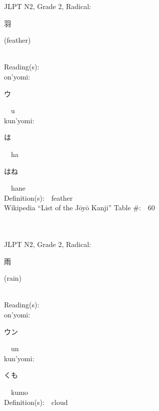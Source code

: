 \begin{multicols}{2}
{JLPT N2, Grade 2, Radical:\ \ {\begin{CJK}{UTF8}{min} 羽 \end{CJK}} (feather) } \\
Reading(s):\ \ \\
{\hspace*{1em}}on'yomi:\ \ \\
{\hspace*{2em}}{\begin{CJK}{UTF8}{min} ウ \end{CJK}}\ \ u\ \ \\
{\hspace*{1em}}kun'yomi:\ \ \\
{\hspace*{2em}}{\begin{CJK}{UTF8}{min} は \end{CJK}}\ \ ha\ \ \\
{\hspace*{2em}}{\begin{CJK}{UTF8}{min} はね \end{CJK}}\ \ hane\ \ \\
Definition(s):\ \ feather \\
Wikipedia ``List of the J\=oy\=o Kanji'' Table \#:\ \ 60 \\
\ \ \\
{\fontsize{34pt}{40pt}  }\ \ \\  %
{JLPT N2, Grade 2, Radical:\ \ {\begin{CJK}{UTF8}{min} 雨 \end{CJK}} (rain) } \\
Reading(s):\ \ \\
{\hspace*{1em}}on'yomi:\ \ \\
{\hspace*{2em}}{\begin{CJK}{UTF8}{min} ウン \end{CJK}}\ \ un\ \ \\
{\hspace*{1em}}kun'yomi:\ \ \\
{\hspace*{2em}}{\begin{CJK}{UTF8}{min} くも \end{CJK}}\ \ kumo\ \ \\
Definition(s):\ \ cloud \\

\end{multicols}
